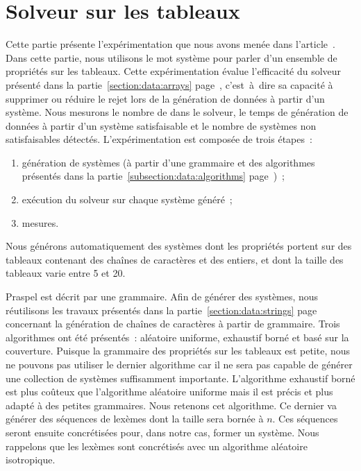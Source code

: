 \section{Solveur sur les tableaux}
\label{section:experimentation:solver}

Cette partie présente l'expérimentation que nous avons menée dans
l'article~. Dans cette partie, nous utilisons le mot
{\strong système} pour parler d'un ensemble de propriétés sur les tableaux.
Cette expérimentation évalue l'efficacité du solveur présenté dans la
partie~\ref{section:data:arrays} page~\pageref{section:data:arrays},
c'est~à~dire sa capacité à supprimer ou réduire le rejet lors de la génération
de données à partir d'un système. Nous mesurons le nombre de
 dans le solveur, le temps de génération de données à
partir d'un système satisfaisable et le nombre de systèmes non satisfaisables
détectés. L'expérimentation est composée de trois étapes~:
%
\begin{enumerate}

\item génération de systèmes (à partir d'une grammaire et des algorithmes
présentés dans la partie~\ref{subsection:data:algorithms}
page~\pageref{subsection:data:algorithms})~;

\item exécution du solveur sur chaque système généré~;

\item mesures.

\end{enumerate}
%
Nous générons automatiquement des systèmes dont les propriétés portent sur des
tableaux contenant des chaînes de caractères et des entiers, et dont la taille
des tableaux varie entre 5 et 20.

Praspel est décrit par une grammaire. Afin de générer des systèmes, nous
réutilisons les travaux présentés dans la partie~\ref{section:data:strings}
page~\pageref{section:data:strings} concernant la génération de chaînes de
caractères à partir de grammaire. Trois algorithmes ont été présentés~:
aléatoire uniforme, exhaustif borné et basé sur la couverture. Puisque la
grammaire des propriétés sur les tableaux est petite, nous ne pouvons pas
utiliser le dernier algorithme car il ne sera pas capable de générer une
collection de systèmes suffisamment importante. L'algorithme exhaustif borné est
plus coûteux que l'algorithme aléatoire uniforme mais il est précis et plus
adapté à des petites grammaires. Nous retenons cet algorithme. Ce dernier va
générer des séquences de lexèmes dont la taille sera bornée à $n$. Ces séquences
seront ensuite concrétisées pour, dans notre cas, former un système. Nous
rappelons que les lexèmes sont concrétisés avec un algorithme aléatoire
isotropique.

